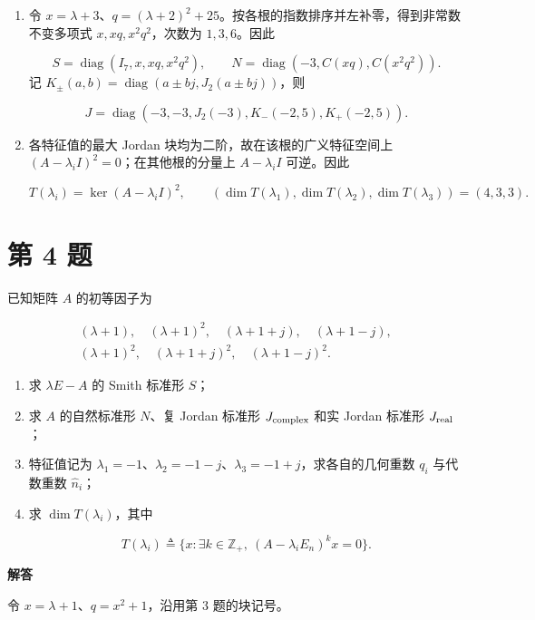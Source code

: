 \documentclass[UTF8,10pt,letterpaper,fontset=fandol]{ctexart}
\begin{document}
\begin{enumerate}
\item 令 $x=\lambda+3$、$q=(\lambda+2)^2+25$。按各根的指数排序并左补零，得到非常数不变多项式 $x,xq,x^2q^2$，次数为 $1,3,6$。因此

\[
\boxed{S=\operatorname{diag}(I_7,x,xq,x^2q^2),\qquad N=\operatorname{diag}(-3,C(xq),C(x^2q^2))}.
\]
记 $K_\pm(a,b)=\operatorname{diag}(a\pm bj,J_2(a\pm bj))$，则

\[
\boxed{J=\operatorname{diag}(-3,-3,J_2(-3),K_-(-2,5),K_+(-2,5))}.
\]

\item 各特征值的最大 Jordan 块均为二阶，故在该根的广义特征空间上 $(A-\lambda_iI)^2=0$；在其他根的分量上 $A-\lambda_iI$ 可逆。因此

\[
\boxed{T(\lambda_i)=\ker(A-\lambda_iI)^2,\qquad (\dim T(\lambda_1),\dim T(\lambda_2),\dim T(\lambda_3))=(4,3,3)}.
\]

\end{enumerate}

\newpage

\section{第 4 题}
已知矩阵 $A$ 的初等因子为

\[
\begin{gathered}
(\lambda+1),\quad(\lambda+1)^2,\quad(\lambda+1+j),\quad(\lambda+1-j),\\
(\lambda+1)^2,\quad(\lambda+1+j)^2,\quad(\lambda+1-j)^2.
\end{gathered}
\]

\begin{enumerate}
\item 求 $\lambda E-A$ 的 Smith 标准形 $S$；

\item 求 $A$ 的自然标准形 $N$、复 Jordan 标准形 $J_{\rm complex}$ 和实 Jordan 标准形 $J_{\rm real}$；

\item 特征值记为 $\lambda_1=-1$、$\lambda_2=-1-j$、$\lambda_3=-1+j$，求各自的几何重数 $q_i$ 与代数重数 $\widehat n_i$；

\item 求 $\dim T(\lambda_i)$，其中

\[
T(\lambda_i)\triangleq\{x:\exists k\in\mathbb Z_+,\ (A-\lambda_iE_n)^kx=0\}.
\]

\end{enumerate}

\par{}\textbf{解答}\par
令 $x=\lambda+1$、$q=x^2+1$，沿用第 3 题的块记号。
\end{document}
